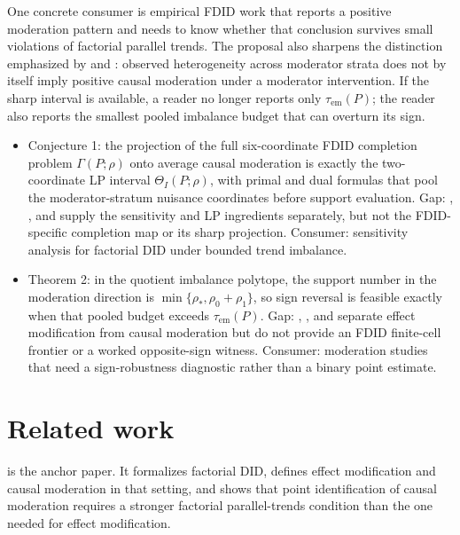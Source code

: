 \documentclass[11pt]{article}
\theoremstyle{definition}
\theoremstyle{plain}
\theoremstyle{remark}
\begin{document}
One concrete consumer is empirical FDID work that reports a positive moderation pattern and needs to know whether that conclusion survives small violations of factorial parallel trends. The proposal also sharpens the distinction emphasized by \citet{Bansak2021CausalModeration} and \citet{VanderWeele2009InteractionEffectModification}: observed heterogeneity across moderator strata does not by itself imply positive causal moderation under a moderator intervention. If the sharp interval is available, a reader no longer reports only \(\tau_{\mathrm{em}}(P)\); the reader also reports the smallest pooled imbalance budget that can overturn its sign.

\begin{itemize}[leftmargin=*]
\item Conjecture 1: the projection of the full six-coordinate FDID completion problem \(\Gamma(P;\rho)\) onto average causal moderation is exactly the two-coordinate LP interval \(\Theta_I(P;\rho)\), with primal and dual formulas that pool the moderator-stratum nuisance coordinates before support evaluation. Gap: \citet{RambachanRoth2023ParallelTrends}, \citet{BalkePearl1997Bounds}, and \citet{Demuynck2015LPBounds} supply the sensitivity and LP ingredients separately, but not the FDID-specific completion map or its sharp projection. Consumer: sensitivity analysis for factorial DID under bounded trend imbalance.
\item Theorem 2: in the quotient imbalance polytope, the support number in the moderation direction is \(\min\{\rho_\ast,\rho_0+\rho_1\}\), so sign reversal is feasible exactly when that pooled budget exceeds \(\tau_{\mathrm{em}}(P)\). Gap: \citet{XuZhaoDing2026FDID}, \citet{Bansak2021CausalModeration}, and \citet{VanderWeele2009InteractionEffectModification} separate effect modification from causal moderation but do not provide an FDID finite-cell frontier or a worked opposite-sign witness. Consumer: moderation studies that need a sign-robustness diagnostic rather than a binary point estimate.
\end{itemize}

\section{Related work}
\citet{XuZhaoDing2026FDID} is the anchor paper. It formalizes factorial DID, defines effect modification and causal moderation in that setting, and shows that point identification of causal moderation requires a stronger factorial parallel-trends condition than the one needed for effect modification.
\end{document}
